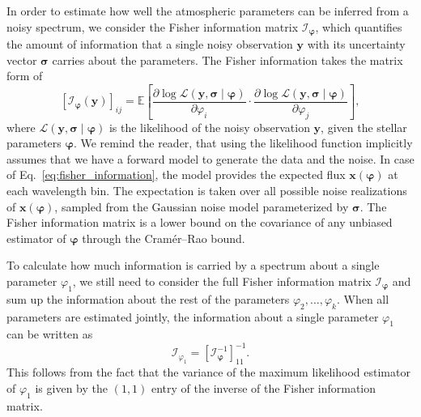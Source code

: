 \documentclass[twocolumn]{aastex7}
\newcommand{\m}[1]{\boldsymbol{#1}}
\begin{document}
In order to estimate how well the atmospheric parameters can be inferred from a noisy spectrum, we consider the Fisher information matrix $\mathcal{I}_{\m{\varphi}}$, which quantifies the amount of information that a single noisy observation $\m{y}$ with its uncertainty vector $\m{\sigma}$ carries about the parameters. The Fisher information takes the matrix form of
\begin{equation}
    \left[ \mathcal{I}_{\m{\varphi}}(\m{y}) \right]_{ij} =
        \mathbb{E}\!\left[
            \frac
                {\partial \log \mathcal{L}(\m{y}, \m{\sigma} \mid \m{\varphi})}
                {\partial \varphi_i} \cdot
            \frac
                {\partial \log \mathcal{L}(\m{y}, \m{\sigma} \mid \m{\varphi})}
                {\partial \varphi_j}
        \right],
    \label{eq:fisher_information}
\end{equation}
where $\mathcal{L}(\m{y},\m{\sigma} \mid \m{\varphi})$ is the likelihood of the noisy observation $\m{y}$, given the stellar parameters $\m{\varphi}$. We remind the reader, that using the likelihood function implicitly assumes that we have a forward model to generate the data and the noise. In case of Eq.~\ref{eq:fisher_information}, the model provides the expected flux $\m{x}(\m{\varphi})$ at each wavelength bin. The expectation is taken over all possible noise realizations of $\m{x}(\m{\varphi})$, sampled from the Gaussian noise model parameterized by $\m{\sigma}$. The Fisher information matrix is a lower bound on the covariance of any unbiased estimator of $\m{\varphi}$ through the Cramér--Rao bound.

To calculate how much information is carried by a spectrum about a single parameter $\varphi_1$, we still need to consider the full Fisher information matrix $\mathcal{I}_{\m{\varphi}}$ and sum up the information about the rest of the parameters $\varphi_2,\dots,\varphi_k$. When all parameters are estimated jointly, the information about a single parameter $\varphi_1$ can be written as
\begin{equation}
    \mathcal{I}_{\varphi_1} = \left[ \mathcal{I}_{\m{\varphi}}^{-1} \right]_{11}^{-1}.
    \label{eq:fisher_information_1d}
\end{equation}
This follows from the fact that the variance of the maximum likelihood estimator of $\varphi_1$ is given by the $(1,1)$ entry of the inverse of the Fisher information matrix.
\end{document}
